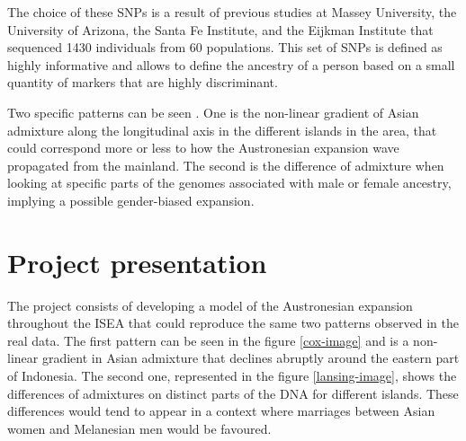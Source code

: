\documentclass[a4paper,12pt]{report}
\begin{document}
The choice of these SNPs is a result of previous studies at Massey University, the University of Arizona, the Santa Fe Institute, and the Eijkman Institute that sequenced 1430 individuals from 60 populations. This set of SNPs is defined as highly informative and allows to define the ancestry of a person based on a small quantity of markers that are highly discriminant.

Two specific patterns can be seen \cite{Lan01}. One is the non-linear gradient of Asian admixture along the longitudinal axis in the different islands in the area, that could correspond more or less to how the Austronesian expansion wave propagated from the mainland. The second is the difference of admixture when looking at specific parts of the genomes associated with male or female ancestry, implying a possible gender-biased expansion.


\chapter{Project presentation}
The project consists of developing a model of the Austronesian expansion throughout the ISEA that could reproduce the same two patterns observed in the real data.
The first pattern can be seen in the figure \ref{cox-image} and is a non-linear gradient in Asian admixture that declines abruptly around the eastern part of Indonesia. The second one, represented in the figure \ref{lansing-image}, shows the differences of admixtures on distinct parts of the DNA for different islands. These differences would tend to appear in a context where marriages between Asian women and Melanesian men would be favoured.
\end{document}
